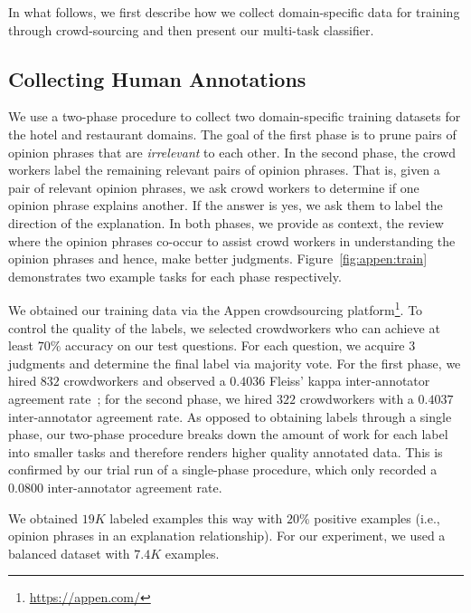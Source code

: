 In what follows, we first describe how we collect domain-specific data for training through crowd-sourcing and then present our multi-task classifier.


\subsection{Collecting Human Annotations}


We use a two-phase procedure to collect two domain-specific training datasets for the hotel and restaurant domains.
The goal of the first phase is to prune
pairs of opinion phrases that are \textit{irrelevant} to each other. In the second phase, the crowd workers label the remaining relevant pairs of opinion phrases. That is, given a pair of relevant opinion phrases, we ask crowd workers to determine if one opinion phrase explains another. If the answer is yes, we ask them to label the direction of the explanation. In both phases, 
we provide as context, the review where the opinion phrases co-occur
to assist crowd workers in understanding the opinion phrases and hence, make better judgments. Figure~\ref{fig:appen:train} demonstrates two example tasks for each phase respectively. 

We obtained our training data via the Appen crowdsourcing platform\footnote{\url{https://appen.com/}}. To control the quality of the labels, we selected crowdworkers who can achieve at least $70\%$ accuracy on our test questions. For each question, we acquire 3 judgments and determine the final label via majority vote. For the first phase, we hired $832$ crowdworkers and observed a $0.4036$ Fleiss' kappa inter-annotator agreement rate~\cite{fleiss2013statistical}; for the second phase, we hired $322$ crowdworkers with a $0.4037$ inter-annotator agreement rate. 
As opposed to obtaining labels through a single phase, our two-phase procedure breaks down the amount of work for each label into smaller tasks and therefore renders higher quality annotated data. This is confirmed by our trial run of a single-phase procedure, which only recorded a $0.0800$ inter-annotator agreement rate.



We obtained $19K$ labeled examples this way with $20\%$ positive examples (i.e., opinion phrases in an explanation relationship). For our experiment, we used a balanced dataset with $7.4K$ examples. 




